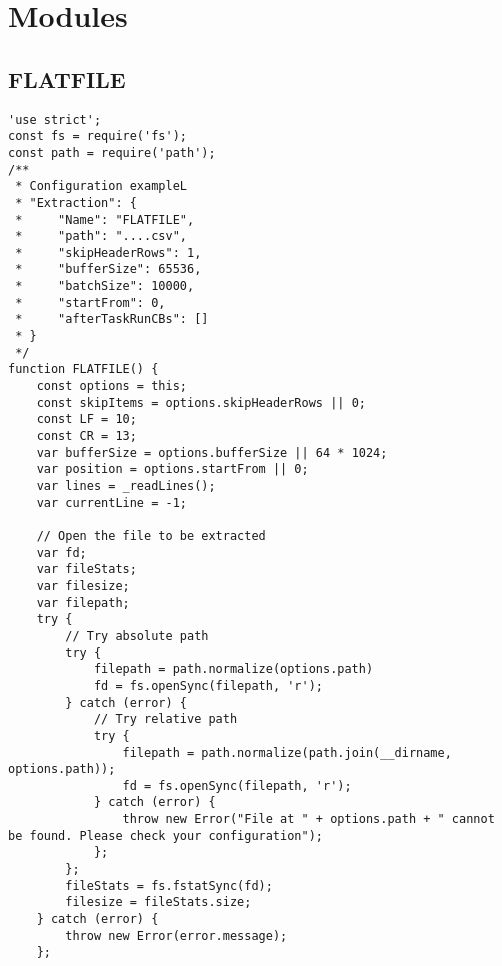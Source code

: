 \section{Modules}
\label{appendix:netl-modules}

\subsection{FLATFILE}
\label{netl-extract-flatfile}
\begin{verbatim}
'use strict';
const fs = require('fs');
const path = require('path');
/**
 * Configuration exampleL
 * "Extraction": {
 *     "Name": "FLATFILE",
 *     "path": "....csv",
 *     "skipHeaderRows": 1,
 *     "bufferSize": 65536,
 *     "batchSize": 10000,
 *     "startFrom": 0,
 *     "afterTaskRunCBs": []
 * }
 */
function FLATFILE() {
    const options = this;
    const skipItems = options.skipHeaderRows || 0;
    const LF = 10;
    const CR = 13;
    var bufferSize = options.bufferSize || 64 * 1024;
    var position = options.startFrom || 0;
    var lines = _readLines();
    var currentLine = -1;

    // Open the file to be extracted
    var fd;
    var fileStats;
    var filesize;
    var filepath;
    try {
        // Try absolute path
        try {
            filepath = path.normalize(options.path)
            fd = fs.openSync(filepath, 'r');
        } catch (error) {
            // Try relative path
            try {
                filepath = path.normalize(path.join(__dirname, options.path));
                fd = fs.openSync(filepath, 'r');
            } catch (error) {
                throw new Error("File at " + options.path + " cannot be found. Please check your configuration");
            };
        };
        fileStats = fs.fstatSync(fd);
        filesize = fileStats.size;
    } catch (error) {
        throw new Error(error.message);
    };


\end{verbatim}
